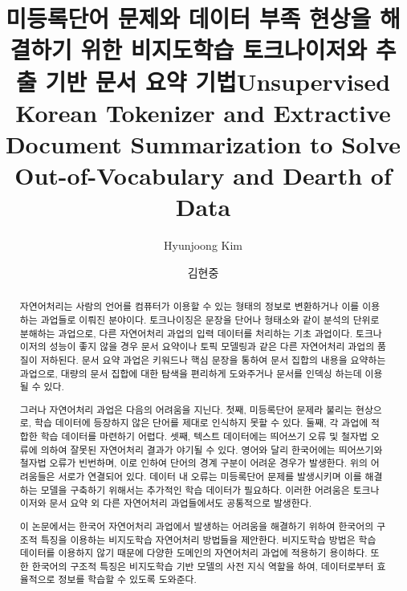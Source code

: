 \documentclass[oneside, ko,phd]{snuthesis_utf8_kor}
\title{미등록단어 문제와 데이터 부족 현상을 해결하기 위한 비지도학습 토크나이저와 추출 기반 문서 요약 기법}
\title*{Unsupervised Korean Tokenizer and Extractive Document Summarization to Solve Out-of-Vocabulary and Dearth of Data}
\author{Hyunjoong Kim}
\author*{김현중} %
\begin{document}
\makefrontcover
\makeapproval

\cleardoublepage
{}
\begin{abstract}
자연어처리는 사람의 언어를 컴퓨터가 이용할 수 있는 형태의 정보로 변환하거나 이를 이용하는 과업들로 이뤄진 분야이다.
토크나이징은 문장을 단어나 형태소와 같이 분석의 단위로 분해하는 과업으로, 다른 자연어처리 과업의 입력 데이터를 처리하는 기초 과업이다.
토크나이저의 성능이 좋지 않을 경우 문서 요약이나 토픽 모델링과 같은 다른 자연어처리 과업의 품질이 저하된다.
문서 요약 과업은 키워드나 핵심 문장을 통하여 문서 집합의 내용을 요약하는 과업으로, 대량의 문서 집합에 대한 탐색을 편리하게 도와주거나 문서를 인덱싱 하는데 이용될 수 있다.

그러나 자연어처리 과업은 다음의 어려움을 지닌다.
첫째, 미등록단어 문제라 불리는 현상으로, 학습 데이터에 등장하지 않은 단어를 제대로 인식하지 못할 수 있다.
둘째, 각 과업에 적합한 학습 데이터를 마련하기 어렵다.
셋째, 텍스트 데이터에는 띄어쓰기 오류 및 철자법 오류에 의하여 잘못된 자연어처리 결과가 야기될 수 있다.
영어와 달리 한국어에는 띄어쓰기와 철자법 오류가 빈번하며, 이로 인하여 단어의 경계 구분이 어려운 경우가 발생한다.
위의 어려움들은 서로가 연결되어 있다.
데이터 내 오류는 미등록단어 문제를 발생시키며 이를 해결하는 모델을 구축하기 위해서는 추가적인 학습 데이터가 필요하다.
이러한 어려움은 토크나이저와 문서 요약 외 다른 자연어처리 과업들에서도 공통적으로 발생한다.

이 논문에서는 한국어 자연어처리 과업에서 발생하는 어려움을 해결하기 위하여 한국어의 구조적 특징을 이용하는 비지도학습 자연어처리 방법들을 제안한다.
비지도학습 방법은 학습 데이터를 이용하지 않기 때문에 다양한 도메인의 자연어처리 과업에 적용하기 용이하다.
또한 한국어의 구조적 특징은 비지도학습 기반 모델의 사전 지식 역할을 하여, 데이터로부터 효율적으로 정보를 학습할 수 있도록 도와준다.


\end{abstract}
\end{document}
